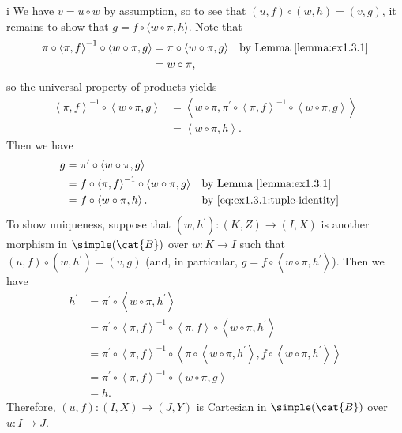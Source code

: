 \begin{partsolution}{i}
We have \(v = u \circ w\) by assumption, so to see that \((u, f) \circ (w, h) = (v, g)\), it remains to show that \(g = f \circ \langle w\circ\pi, h\rangle\).
Note that
\begin{align*}
\pi \circ \left\langle \pi, f\right\rangle^{-1} \circ \left\langle w \circ \pi, g\right\rangle
&= \pi \circ \left\langle w \circ \pi, g\right\rangle & &\text{by Lemma~\ref{lemma:ex1.3.1}} \\
&= w \circ \pi,
\end{align*}
so the universal property of products yields
\begin{equation}
\label{eq:ex1.3.1:tuple-identity}
\begin{aligned}
\left\langle \pi, f\right\rangle^{-1} \circ \left\langle w \circ \pi, g\right\rangle
&= \left\langle w \circ \pi, \pi^\prime \circ \left\langle\pi, f\right\rangle^{-1} \circ \left\langle w \circ \pi, g\right\rangle\right\rangle \\
&= \left\langle w \circ \pi, h\right\rangle.
\end{aligned}
\end{equation}
Then we have
\begin{align*}
g
&= \pi^\prime \circ \left\langle w \circ \pi, g\right\rangle \\
&= f \circ \left\langle \pi, f\right\rangle^{-1} \circ \left\langle w \circ \pi, g\right\rangle & &\text{by Lemma~\ref{lemma:ex1.3.1}} \\
&= f \circ \left\langle w \circ \pi, h\right\rangle. & &\text{by~\eqref{eq:ex1.3.1:tuple-identity}}
\end{align*}
To show uniqueness, suppose that \((w, h^\prime) : (K, Z) \to (I, X)\) is another morphism in \(\simple(\cat{B})\) over \(w: K \to I\) such that \((u, f) \circ (w, h^\prime) = (v, g)\) (and, in particular, \(g = f \circ \left\langle w \circ \pi, h^\prime\right\rangle\)).
Then we have
\begin{align*}
h^\prime
&= \pi^\prime \circ \left\langle w \circ \pi, h^\prime\right\rangle \\
&= \pi^\prime \circ \left\langle \pi, f\right\rangle^{-1} \circ \left\langle \pi, f\right\rangle \circ \left\langle w \circ \pi, h^\prime\right\rangle \\
&= \pi^\prime \circ \left\langle \pi, f\right\rangle^{-1} \circ \left\langle \pi \circ \left\langle w \circ \pi, h^\prime\right\rangle, f \circ \left\langle w \circ \pi, h^\prime\right\rangle\right\rangle \\
&= \pi^\prime \circ \left\langle \pi, f\right\rangle^{-1} \circ \left\langle  w \circ \pi, g\right\rangle \\
&= h.
\end{align*}
Therefore, \((u, f) : (I, X) \to (J, Y)\) is Cartesian in \(\simple(\cat{B})\) over \(u : I \to J\).
\end{partsolution}

